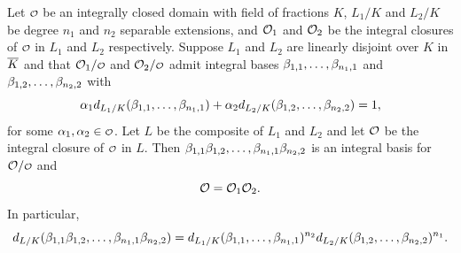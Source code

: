     \begin{proposition}\label{prop:linearly_disjoint_integral_basis}
      Let \(\smc{O}\) be an integrally closed domain with field of fractions \(K\), \(L_{1}/K\) and \(L_{2}/K\) be degree \(n_{1}\) and \(n_{2}\) separable extensions, and \(\mathcal{O}_{1}\) and \(\mathcal{O}_{2}\) be the integral closures of \(\smc{O}\) in \(L_{1}\) and \(L_{2}\) respectively. Suppose \(L_{1}\) and \(L_{2}\) are linearly disjoint over \(K\) in \(\overline{K}\) and that \(\mc{O}_{1}/\smc{O}\) and \(\mc{O}_{2}/\smc{O}\) admit integral bases \(\beta_{1,1},\ldots,\beta_{n_{1},1}\) and \(\beta_{1,2},\ldots,\beta_{n_{2},2}\) with
      \[
        \alpha_{1}d_{L_{1}/K}(\beta_{1,1},\ldots,\beta_{n_{1},1})+\alpha_{2}d_{L_{2}/K}(\beta_{1,2},\ldots,\beta_{n_{2},2}) = 1,
      \]
      for some \(\a_{1},\a_{2} \in \smc{O}\). Let \(L\) be the composite of \(L_{1}\) and \(L_{2}\) and let \(\mathcal{O}\) be the integral closure of \(\smc{O}\) in \(L\). Then \(\beta_{1,1}\beta_{1,2},\ldots,\beta_{n_{1},1}\beta_{n_{2},2}\) is an integral basis for \(\mc{O}/\smc{O}\) and
      \[
        \mathcal{O} =\mathcal{O}_{1}\mathcal{O}_{2}.
      \]
      In particular,
      \[
        d_{L/K}(\beta_{1,1}\beta_{1,2},\ldots,\beta_{n_{1},1}\beta_{n_{2},2}) = d_{L_{1}/K}(\beta_{1,1},\ldots,\beta_{n_{1},1})^{n_{2}}d_{L_{2}/K}(\beta_{1,2},\ldots,\beta_{n_{2},2})^{n_{1}}.
      \]
    \end{proposition}

